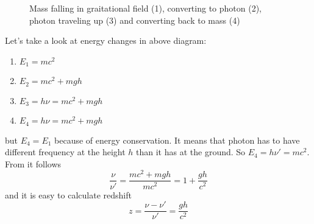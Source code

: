 \begin{wrapfigure}[16]{L}{0.5\linewidth}
    \centering
    \caption{Mass falling in graitational field (1), converting to
    photon (2), photon traveling up (3) and converting
    back to mass (4)}
\end{wrapfigure}

Let's take a look at energy changes in above diagram:
\begin{enumerate}[label=\protect\circled{\arabic*}]
    \item $E_1 = mc^2$
    \item $E_2 = mc^2 + mgh$
    \item $E_3 = h\nu = mc^2 + mgh$
    \item $E_4 = h\nu = mc^2 + mgh$
\end{enumerate}
but $E_4 = E_1$ because of energy conservation. It means that photon has to have
different frequency at the height $h$ than it has at the ground. So $E_4 = h\nu'
= mc^2$. From it follows
%
\begin{equation}
    \frac{\nu}{\nu'} = \frac{mc^2+mgh}{mc^2} = 1 + \frac{gh}{c^2}
\end{equation}
%
and it is easy to calculate redshift 
%
\begin{equation}
    z = \frac{\nu - \nu'}{\nu'} = \frac{gh}{c^2}
    \label{eq:prob2a_res}
\end{equation}

